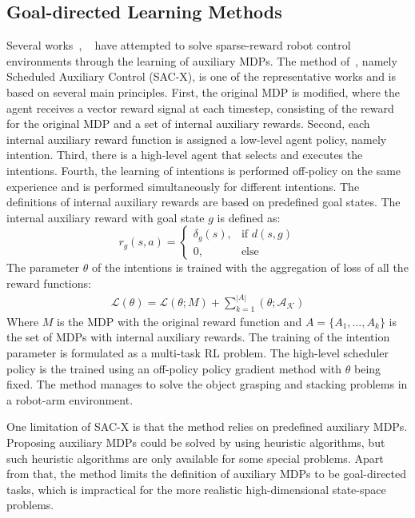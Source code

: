 \subsection{Goal-directed Learning Methods}
Several works~\cite{riedmiller2018learning}, ~\cite{andrychowicz2017hindsight} have attempted to solve sparse-reward robot control environments through the learning of auxiliary MDPs.
The method of~\cite{riedmiller2018learning}, namely Scheduled Auxiliary Control (SAC-X), is one of the representative works and is based on several main principles. First, the original MDP is modified, where the agent receives a vector reward signal at each timestep, consisting of the reward for the original MDP and a set of internal auxiliary rewards. Second, each internal auxiliary reward function is assigned a low-level agent policy, namely intention. Third, there is a high-level agent that selects and executes the intentions. Fourth, the learning of intentions is performed off-policy on the same experience and is performed simultaneously for different intentions.
The definitions of internal auxiliary rewards are based on predefined goal states. The internal auxiliary reward with goal state $g$ is defined as:
\begin{equation}
r_g(s,a)=
\begin{cases}
\delta_g(s),& \text{if } d(s,g)\\
0,              & \text{else}
\end{cases}
\end{equation}
The parameter $\theta$ of the intentions is trained with the aggregation of loss of all the reward functions:
\begin{align}
\mathcal{L}(\theta)  = \mathcal{L}(\theta;M) +\sum_{k=1}^{|A|} (\mathcal{\theta;A_K})
\end{align}
Where $M$ is the MDP with the original reward function and $A=\{A_1,\dots,A_k\}$ is the set of MDPs with internal auxiliary rewards. The training of the intention parameter is formulated as a multi-task RL problem.
The high-level scheduler policy is the trained using an off-policy policy gradient method with $\theta$ being fixed.
The method manages to solve the object grasping and stacking problems in a robot-arm environment. 

One limitation of SAC-X is that the method relies on predefined auxiliary MDPs. Proposing auxiliary MDPs could be solved by using heuristic algorithms, but such heuristic algorithms are only available for some special problems. Apart from that, the method limits the definition of auxiliary MDPs to be goal-directed tasks, which is impractical for the more realistic high-dimensional state-space problems.


